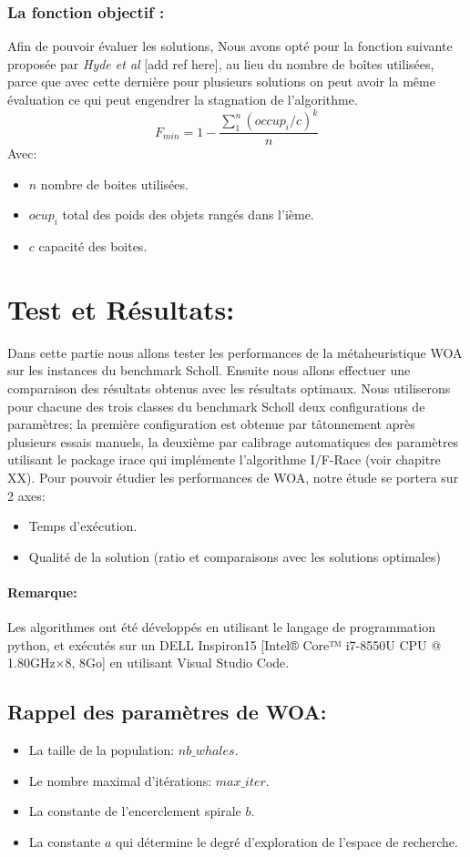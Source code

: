\documentclass[12pt]{article}
\begin{document}
\subsubsection{La fonction objectif :}
Afin de pouvoir évaluer les solutions, Nous avons opté pour la fonction suivante proposée par \emph{Hyde et al} [add ref here], au lieu du nombre de boîtes utilisées, parce que avec cette dernière pour plusieurs solutions on peut avoir la même évaluation ce qui peut engendrer la stagnation de l’algorithme.
\[ F_{min} = 1 - \frac{\sum_{1}^{n} (occup_i / c)^k}{n}\]
Avec:
\begin{itemize}
    \item \(n\) nombre de boites utilisées.
    \item \(ocup_i\) total des poids des objets rangés dans l’ième.
    \item \(c\) capacité des boites.
    
\end{itemize}
\section{Test et Résultats: }
Dans cette partie nous allons tester les performances de la métaheuristique WOA sur les instances du benchmark Scholl. Ensuite nous allons effectuer une comparaison des résultats obtenus avec les résultats optimaux. Nous utiliserons pour chacune des trois classes du benchmark Scholl deux configurations de paramètres; la première configuration est obtenue par tâtonnement après plusieurs essais manuels, la deuxième par calibrage automatiques des paramètres utilisant le package irace qui implémente l’algorithme I/F-Race (voir chapitre XX).
Pour pouvoir étudier les performances de WOA, notre étude se portera sur 2 axes:
\begin{itemize}
    \item Temps d'exécution.
    \item Qualité de la solution  (ratio et comparaisons avec les solutions optimales)
\end{itemize}

\paragraph{Remarque: }
Les algorithmes ont été développés en utilisant le langage de programmation python, et exécutés sur un DELL Inspiron15 [Intel® Core™ i7-8550U CPU @ 1.80GHz×8, 8Go] en utilisant Visual Studio Code.
\subsection{Rappel des paramètres de WOA: }
\begin{itemize}
    \item La taille de la population: \(nb\_whales\).
    \item Le nombre maximal d’itérations: \(max\_iter\).
    \item La constante de l’encerclement spirale \(b\).
    \item La constante \(a\) qui détermine le degré d’exploration de l’espace de recherche.
\end{itemize}
\end{document}
